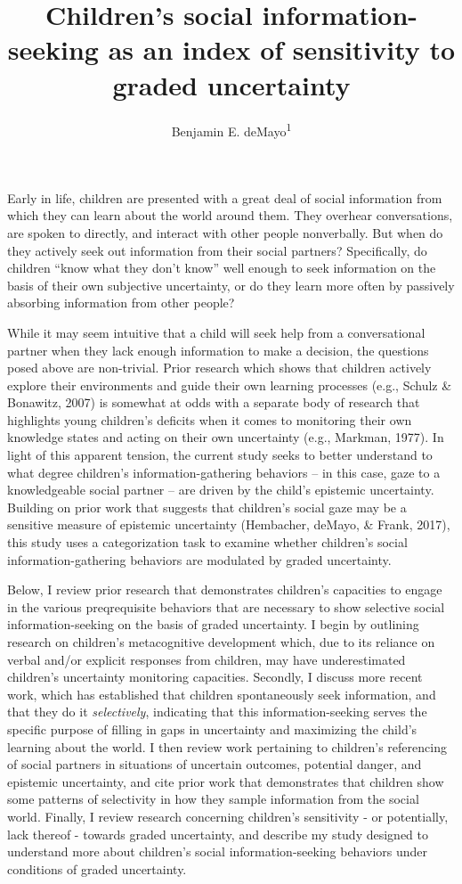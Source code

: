 \documentclass[,man,floatsintext]{apa6}
\title{Children's social information-seeking as an index of sensitivity to graded uncertainty}
\author{Benjamin E. deMayo\textsuperscript{1}}
\date{}
\affiliation{
\vspace{0.5cm}
\textsuperscript{1}  Stanford University}
\begin{document}
\maketitle

Early in life, children are presented with a great deal of social information from which they can learn about the world around them. They overhear conversations, are spoken to directly, and interact with other people nonverbally. But when do they actively seek out information from their social partners? Specifically, do children \enquote{know what they don't know} well enough to seek information on the basis of their own subjective uncertainty, or do they learn more often by passively absorbing information from other people?

While it may seem intuitive that a child will seek help from a conversational partner when they lack enough information to make a decision, the questions posed above are non-trivial. Prior research which shows that children actively explore their environments and guide their own learning processes (e.g., Schulz \& Bonawitz, 2007) is somewhat at odds with a separate body of research that highlights young children's deficits when it comes to monitoring their own knowledge states and acting on their own uncertainty (e.g., Markman, 1977). In light of this apparent tension, the current study seeks to better understand to what degree children's information-gathering behaviors -- in this case, gaze to a knowledgeable social partner -- are driven by the child's epistemic uncertainty. Building on prior work that suggests that children's social gaze may be a sensitive measure of epistemic uncertainty (Hembacher, deMayo, \& Frank, 2017), this study uses a categorization task to examine whether children's social information-gathering behaviors are modulated by graded uncertainty.

Below, I review prior research that demonstrates children's capacities to engage in the various preqrequisite behaviors that are necessary to show selective social information-seeking on the basis of graded uncertainty. I begin by outlining research on children's metacognitive development which, due to its reliance on verbal and/or explicit responses from children, may have underestimated children's uncertainty monitoring capacities. Secondly, I discuss more recent work, which has established that children spontaneously seek information, and that they do it \emph{selectively}, indicating that this information-seeking serves the specific purpose of filling in gaps in uncertainty and maximizing the child's learning about the world. I then review work pertaining to children's referencing of social partners in situations of uncertain outcomes, potential danger, and epistemic uncertainty, and cite prior work that demonstrates that children show some patterns of selectivity in how they sample information from the social world. Finally, I review research concerning children's sensitivity - or potentially, lack thereof - towards graded uncertainty, and describe my study designed to understand more about children's social information-seeking behaviors under conditions of graded uncertainty.
\end{document}
